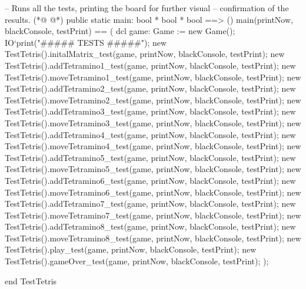 \begin{vdmpp}[breaklines=true]
  -- Runs all the tests, printing the board for further visual 
  -- confirmation of the results.
(*@
\label{main:556}
@*)
  public static main: bool * bool * bool ==> ()
  main(printNow, blackConsole, testPrint) == (
   dcl game: Game := new Game();
   IO`print("\n##### TESTS #####\n");
   new TestTetris().initalMatrix_test(game, printNow, blackConsole, testPrint);
   new TestTetris().addTetramino1_test(game, printNow, blackConsole, testPrint);
   new TestTetris().moveTetramino1_test(game, printNow, blackConsole, testPrint);
   new TestTetris().addTetramino2_test(game, printNow, blackConsole, testPrint);
   new TestTetris().moveTetramino2_test(game, printNow, blackConsole, testPrint);
   new TestTetris().addTetramino3_test(game, printNow, blackConsole, testPrint);
   new TestTetris().moveTetramino3_test(game, printNow, blackConsole, testPrint);
   new TestTetris().addTetramino4_test(game, printNow, blackConsole, testPrint);
   new TestTetris().moveTetramino4_test(game, printNow, blackConsole, testPrint);
   new TestTetris().addTetramino5_test(game, printNow, blackConsole, testPrint);
   new TestTetris().moveTetramino5_test(game, printNow, blackConsole, testPrint);
   new TestTetris().addTetramino6_test(game, printNow, blackConsole, testPrint);
   new TestTetris().moveTetramino6_test(game, printNow, blackConsole, testPrint);
   new TestTetris().addTetramino7_test(game, printNow, blackConsole, testPrint);
   new TestTetris().moveTetramino7_test(game, printNow, blackConsole, testPrint);
   new TestTetris().addTetramino8_test(game, printNow, blackConsole, testPrint);
   new TestTetris().moveTetramino8_test(game, printNow, blackConsole, testPrint);
   new TestTetris().play_test(game, printNow, blackConsole, testPrint);
   new TestTetris().gameOver_test(game, printNow, blackConsole, testPrint);
  );
  
end TestTetris
\end{vdmpp}
